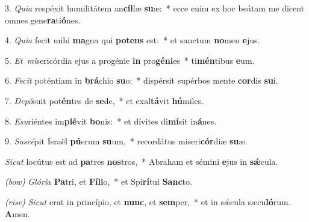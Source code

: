 3. \textit{Quia} respéxit humilitátem an\textbf{cíl}læ \textbf{su}æ:~*
	ecce enim ex hoc beátam me dicent omnes gene\textbf{ra}ti\textbf{ó}nes.

4. \textit{Quia} fecit mihi \textbf{ma}gna qui \textbf{pot}\textbf{ens} est:~*
	et sanctum \textbf{no}men \textbf{e}jus.

5. \textit{Et\ mi}sericórdia ejus a progénie \textbf{in} pro\textbf{gé}\textbf{ni}es~*
	ti\textbf{mén}tibus \textbf{e}um.

6. \textit{Fecit} poténtiam in \textbf{brá}chio \textbf{su}o:~*
	dispérsit supérbos mente \textbf{cor}dis \textbf{su}i.

7. \textit{Depó}suit pot\textbf{én}tes de \textbf{se}de,~*
	et exal\textbf{tá}vit \textbf{hú}miles.

8. \textit{Esu}riéntes im\textbf{plé}vit \textbf{bo}nis:~*
	et dívites di\textbf{mí}sit in\textbf{á}nes.

9. \textit{Suscé}pit Israël \textbf{pú}erum \textbf{su}um,~*
	recordátus miseri\textbf{cór}diæ \textbf{su}æ.

\textit{Sicut} locútus est ad \textbf{pa}tres \textbf{nos}tros,~*
	Abraham et sémini \textbf{e}jus in \textbf{s\'{\ae}}cula.

{\color{red}\textit{(bow)}} \textit{Glóri}a \textbf{Pa}tri, et \textbf{Fí}\textbf{li}o,~*
	et Spi\textbf{rí}tui \textbf{Sanc}to.

{\color{red}\textit{(rise)}} \textit{Sicut} erat in princípio, et \textbf{nunc}, et \textbf{sem}per,~*
	et in s\'{\ae}cula sæcu\textbf{ló}rum. \textbf{A}men.